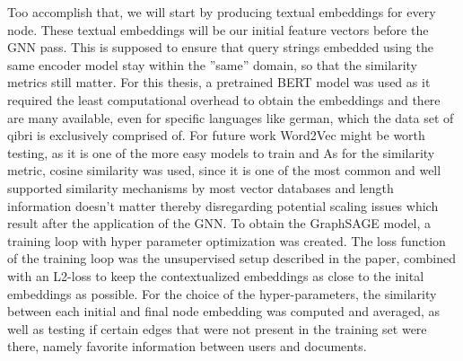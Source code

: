 \documentclass[draft,final]{vutinfth} %
\begin{document}
Too accomplish that, we will start by producing textual embeddings for every node. These textual embeddings will be our initial feature vectors before the GNN pass. This is supposed to ensure that query strings embedded using the same encoder model stay within the ''same'' domain, so that the similarity metrics still matter. For this thesis, a pretrained BERT model was used as it required the least computational overhead to obtain the embeddings and there are many available, even for specific languages like german, which the data set of qibri is exclusively comprised of. For future work Word2Vec might be worth testing, as it is one of the more easy models to train and As for the similarity metric, cosine similarity was used, since it is one of the most common and well supported similarity mechanisms by most vector databases and length information doesn't matter thereby disregarding potential scaling issues which result after the application of the GNN. To obtain the GraphSAGE model, a training loop with hyper parameter optimization was created. The loss function of the training loop was the unsupervised setup described in the paper, combined with an L2-loss to keep the contextualized embeddings as close to the inital embeddings as possible. For the choice of the hyper-parameters, the similarity between each initial and final node embedding was computed and averaged, as well as testing if certain edges that were not present in the training set were there, namely favorite information between users and documents.
\end{document}
